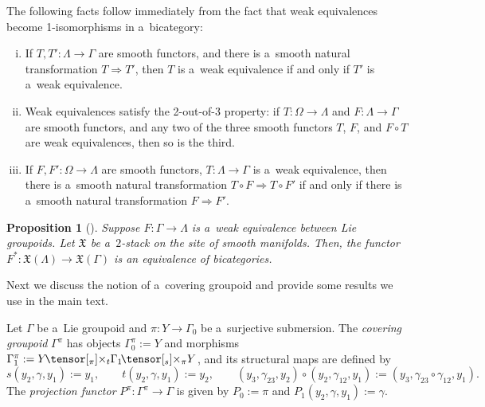 \documentclass[10pt,a4paper]{amsart}
\numberwithin{equation}{section}
\newtheorem{Proposition}[Theorem]{Proposition}
 { \theoremstyle{definition}
\newtheorem{Definition}[Theorem]{Definition}
\newtheorem{Example}[Theorem]{Example}
\newtheorem{Remark}[Theorem]{Remark} }
\def\ttimes#1#2{\hspace{-0.15em}\tensor[_{#1}]{\times}{_{#2}}}
\begin{document}
\begin{Remark}
\label{Lemma: facts about weak equivalences}
The following facts follow immediately from the fact that weak equivalences become 1-isomorphisms in a~bicategory:
 \begin{enumerate}[(i)]\itemsep=0pt
 \item If $T,T'\colon \Lambda \to \Gamma$ are smooth functors, and there is a~smooth natural transformation $T \Rightarrow T'$, then
 $T$ is a~weak equivalence if and only if $T'$ is a~weak equivalence.
 \item\label{2-out-of-3}
 Weak equivalences satisfy the 2-out-of-3 property: if $T \colon \Omega \to \Lambda$ and $F\colon \Lambda \to \Gamma$ are smooth functors,
 and any two of the three smooth functors $T$, $F$, and $F \circ T$ are weak equivalences, then so is the third.
 \item \label{Weak equivalence filling} If $F,F' \colon \Omega \to \Lambda$ are smooth functors, $T \colon \Lambda \to \Gamma$ is a~weak equivalence, then there is a~smooth natural transformation
 $T \circ F \Rightarrow T \circ F'$ if and only if there is a~smooth natural transformation $F \Rightarrow F'$.
 \end{enumerate}
\end{Remark}


\begin{Proposition}[{\cite[Theorem 2.16]{nikolaus2}}] \label{Nikolaus-Schweigert weak equivalences}
 Suppose $F\colon \Gamma \to \Lambda$ is a~weak equivalence between Lie groupoids.
 Let $\mathfrak{X}$ be a~$2$-stack on the site of smooth manifolds. Then, the functor
$
F^{*}\colon \mathfrak{X}(\Lambda) \to \mathfrak{X}(\Gamma)
$
 is an equivalence of bicategories.
\end{Proposition}

Next we discuss the notion of a~covering groupoid and provide some results we use in the main text.

\begin{Definition}
\label{Example : covering groupoid and weak equivalences}
 Let $\Gamma$ be a~Lie groupoid and $\pi\colon Y \to \Gamma_0$ be a~surjective submersion. The
 \emph{covering groupoid} $\Gamma^\pi$ has objects $\Gamma^\pi_0 := Y$ and morphisms $\Gamma^\pi_1 := Y \ttimes\pi t \Gamma_1 \ttimes s\pi Y$, and its structural maps are defined by
\begin{equation*}
s(y_2,\gamma,y_1):= y_1
,\qquad
t(y_2,\gamma,y_1) := y_2
,\qquad
(y_3,\gamma_{23},y_2) \circ (y_2,\gamma_{12},y_1) := (y_3,\gamma_{23} \circ \gamma_{12},y_1).
\end{equation*}
The \emph{projection functor} $P^{\pi}\colon \Gamma^{\pi} \to \Gamma$ is given by $P_0 :=\pi$ and $P_1(y_2,\gamma,y_1) := \gamma$.
\end{Definition}
\end{document}
